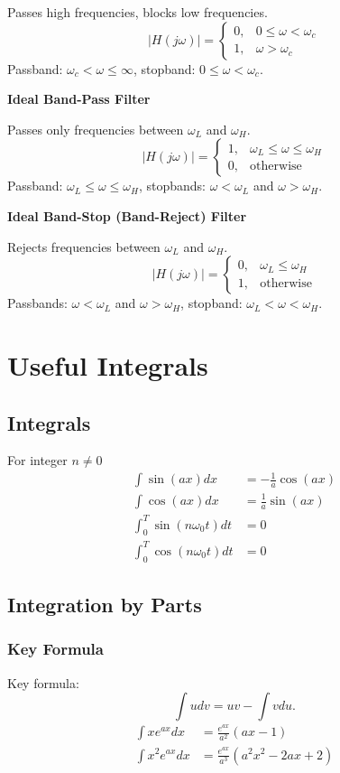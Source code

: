 \documentclass{article}
\begin{document}
Passes high frequencies, blocks low frequencies.
\[
    |H(j\omega )|=\begin{cases}
        0, & 0\leq\omega <\omega _c \\
        1, & \omega >\omega _c
    \end{cases}
\]
\indent Passband: $\omega _c<\omega \leq\infty$, stopband: $0\leq\omega <\omega _c$.

\noindent \textbf{Ideal Band-Pass Filter}

Passes only frequencies between $\omega _L$ and $\omega _H$.
\[
    |H(j\omega )|=\begin{cases}
        1, & \omega _L\leq\omega \leq\omega _H \\
        0, & \text{otherwise}
    \end{cases}
\]
\indent Passband: $\omega _L\leq\omega \leq\omega _H$, stopbands: $\omega <\omega _L$ and $\omega >\omega _H$.

\noindent \textbf{Ideal Band-Stop (Band-Reject) Filter}

Rejects frequencies between $\omega _L$ and $\omega _H$.
\[
    |H(j\omega )|=\begin{cases}
        0, & \omega _L\leq\omega _H \\
        1, & \text{otherwise}
    \end{cases}
\]
\indent Passbands: $\omega <\omega _L$ and $\omega >\omega _H$, stopband: $\omega _L<\omega <\omega _H$.

\section{Useful Integrals}
\subsection{Integrals}
For integer $n\neq0$
\begin{align*}
    \int\sin(ax) dx&= -\frac{1}{a}\cos(ax) \\
    \int\cos(ax)dx&= \frac{1}{a}\sin(ax) \\
    \int_0^T\sin(n\omega _0t)dt&=0 \\
    \int_0^T\cos(n\omega _0t)dt&=0
\end{align*}

\subsection{Integration by Parts}
\subsubsection{Key Formula}
Key formula:
\[
    \int u dv=uv-\int vdu.
\]
\begin{align*}
    \int x e^{ax}dx &= \frac{e^{ax}}{a^2}(ax-1) \\
    \int x^2e^{ax}dx&=\frac{e^{ax}}{a^3}(a^2x^2-2ax+2)
\end{align*}
\end{document}
